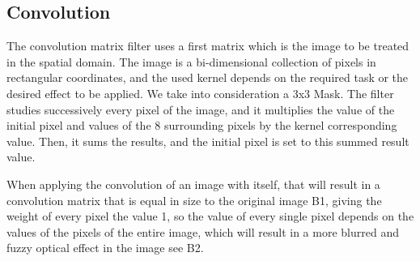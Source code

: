 \documentclass[a4paper,twocolumn]{article}
\begin{document}
	\subsection{Convolution}
	
	The convolution matrix  filter uses a first matrix which is the image to be treated in the spatial domain. The image is a bi-dimensional collection of pixels in rectangular coordinates, and the used kernel depends on the required task or the desired effect to be applied. We take into consideration a 3x3 Mask. The  filter studies successively every pixel of the image, and it multiplies the value of the initial pixel and values of the 8 surrounding pixels by the kernel corresponding value. Then, it sums the results, and the initial pixel is set to this summed result value.
	
	When applying the convolution of an image with itself, that will result in a convolution matrix that is equal in size to the original image B1, giving the weight of every pixel the value 1, so the value of every single pixel depends on the values of the pixels of the entire image, which will result in a more blurred and fuzzy optical effect in the image see B2.
	
\end{document}
